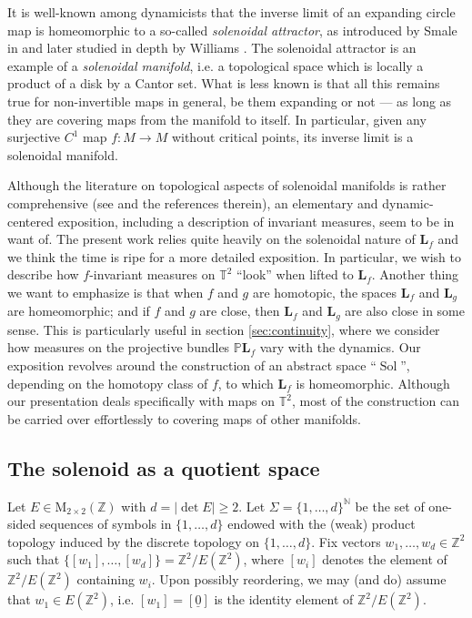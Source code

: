 \documentclass[11pt,letterpaper,reqno]{article}
\newcommand{\Pp}{\mathbb P}
\newcommand{\N}{\mathbb{N}}
\newcommand{\TT}{\mathbb{T}^2}
\newcommand{\ZZ}{\mathbb{Z}^2}
\newcommand{\hTTf}[1][f]{\mathbf{L}_{#1}}
\newcommand{\Mat}{\mathrm{M}_{2 \times 2}(\mathbb{Z})}
\newcommand{\Sol}{\operatorname{Sol}}
\begin{document}
It is well-known among dynamicists that the inverse limit of an expanding circle map is homeomorphic to a so-called \emph{solenoidal attractor}, as introduced by Smale in \cite{SmaleBull} and later studied in depth by Williams \cite{Williams74}. The solenoidal attractor is an example of  a \emph{solenoidal manifold}, i.e. a topological space which is locally a product of a disk by a Cantor set. What is less known is that all this remains true for non-invertible maps in general, be them expanding or not --- as long as they are covering maps from the manifold to itself. In particular, given any surjective $C^1$ map $f: M \to M$ without critical points, its inverse limit is a solenoidal manifold. 

Although the literature on topological aspects of solenoidal manifolds is rather comprehensive (see \cite{Verjovsky22} and the references therein), an elementary and dynamic-centered exposition, including a description of invariant measures, seem to be in want of. The present work relies quite heavily on the solenoidal nature of $\hTTf$ and we think the time is ripe for a more detailed exposition. In particular, we wish to describe how $f$-invariant measures on $\TT$ ``look'' when lifted to $\hTTf$. Another thing we want to emphasize is that when $f$ and $g$ are homotopic, the spaces $\hTTf$ and $\mathbf{L}_g$ are homeomorphic; and if $f$ and $g$ are close, then $\hTTf$ and $\mathbf{L}_g$  are also close in some sense. This is particularly useful in section \ref{sec:continuity}, where we consider how measures on the projective bundles $\Pp \hTTf$ vary with the dynamics. Our exposition revolves around the construction of an abstract space ``$\Sol$'', depending on the homotopy class of $f$, to which $\hTTf$ is homeomorphic. Although our presentation deals specifically with maps on $\TT$, most of the construction can be carried over effortlessly to covering maps of other manifolds. 


\subsection{The solenoid as a quotient space}

Let $E \in \Mat$ with $ d = |\det E| \geq 2$. Let $\Sigma = \{1, \ldots, d\}^{\N}$ be the set of one-sided sequences of symbols in $\{ 1, \ldots, d\}$ endowed with the (weak) product topology induced by the discrete topology on $\{1, \ldots, d\}$. Fix vectors $w_1, \ldots, w_d \in \ZZ$ such that $\{[w_1], \ldots, [w_d]\} = \ZZ / E(\ZZ)$, where $[w_i]$ denotes the element of $\ZZ / E(\ZZ)$ containing $w_i$. Upon possibly reordering, we may (and do) assume that $w_1 \in E(\ZZ)$, i.e. $[w_1] = [\underline{0}]$ is the identity element of $\ZZ / E(\ZZ)$.
\end{document}
